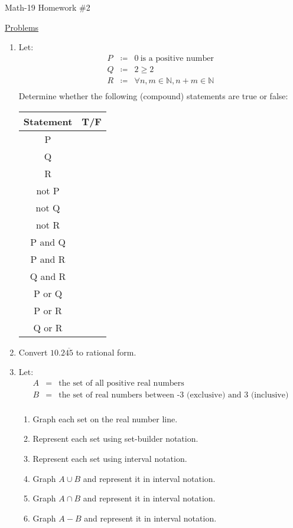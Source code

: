 \documentclass[letterpaper,12pt,fleqn]{article}
\begin{document}
\begin{center}
\Large Math-19 Homework \#2
\end{center}

\vspace{0.5in}

\underline{Problems}

\begin{enumerate}
\item Let:
\begin{eqnarray*}
P &\coloneqq& 0\ \mbox{is a positive number} \\
Q &\coloneqq& 2\ge2 \\
R &\coloneqq& \forall n,m\in\mathbb{N}, n+m\in\mathbb{N} \\
\end{eqnarray*}
Determine whether the following (compound) statements are true or false:

\begin{tabular}{|c|c|}
  \hline
  Statement & T/F \\
  \hline
  P & \\
  \hline
  Q & \\
  \hline
  R & \\
  \hline
  not P & \\
  \hline
  not Q & \\
  \hline
  not R & \\
  \hline
  P and Q & \\
  \hline
  P and R & \\
  \hline
  Q and R & \\
  \hline
  P or Q & \\
  \hline
  P or R & \\
  \hline
  Q or R & \\
  \hline
\end{tabular}

\bigskip

\item Convert $10.2\overline{45}$ to rational form.

\bigskip

\item Let:
\begin{eqnarray*}
A &=& \mbox{the set of all positive real numbers} \\
B &=& \mbox{the set of real numbers between -3 (exclusive) and 3 (inclusive)} \\
\end{eqnarray*}
\begin{enumerate}
\item Graph each set on the real number line.
\item Represent each set using set-builder notation.
\item Represent each set using interval notation.
\item Graph $A\cup B$ and represent it in interval notation.
\item Graph $A\cap B$ and represent it in interval notation.
\item Graph $A-B$ and represent it in interval notation.
\end{enumerate}


\end{enumerate}
\end{document}
